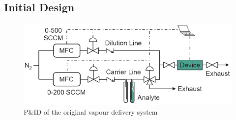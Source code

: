 \documentclass[
  a4paper,
]{scrbook}
\begin{document}
\hypertarget{initial-design}{%
\subsection{Initial Design}\label{initial-design}}

\begin{figure}

{\centering \includegraphics[width=1\textwidth,height=\textheight]{figures/ch5/PID_V0.png}

}

\caption{\label{fig-original-pid}P\&ID of the original vapour delivery
system}

\end{figure}
\end{document}

